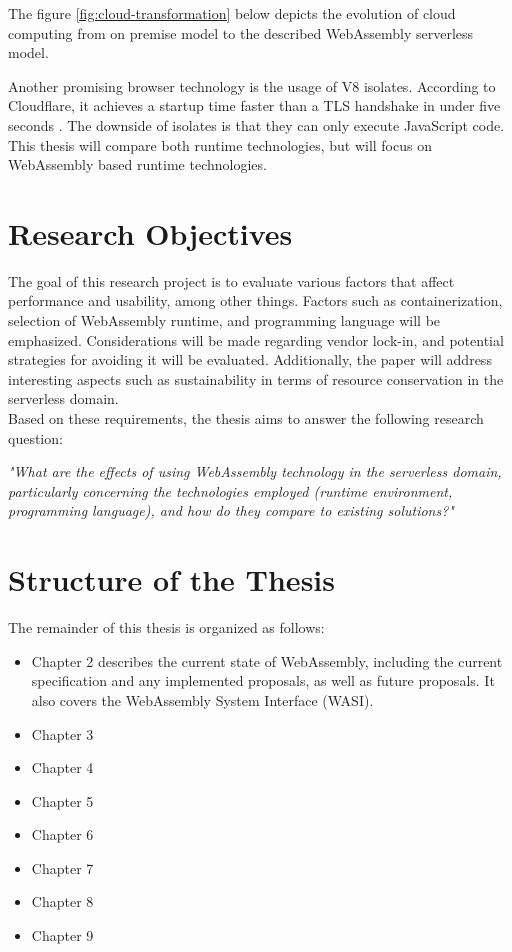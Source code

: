 The figure \ref{fig:cloud-transformation} below depicts the evolution of \gls{cloud computing} from on premise model to the described WebAssembly serverless model.

Another promising browser technology is the usage of V8 \glspl{isolate}. According to Cloudflare, it achieves a startup time faster than a TLS handshake in under five seconds \cite{partovi_2020_eliminating}. The downside of isolates is that they can only execute JavaScript code. This thesis will compare both runtime technologies, but will focus on WebAssembly based runtime technologies.

\section{Research Objectives}
The goal of this research project is to evaluate various factors that affect performance and usability, among other things. Factors such as containerization, selection of WebAssembly runtime, and programming language will be emphasized. Considerations will be made regarding vendor lock-in, and potential strategies for avoiding it will be evaluated. Additionally, the paper will address interesting aspects such as sustainability in terms of resource conservation in the serverless domain. \\
\newline
Based on these requirements, the thesis aims to answer the following research question:
\begin{center}
\textit{"What are the effects of using WebAssembly technology in the serverless domain, particularly concerning the technologies employed (runtime environment, programming language), and how do they compare to existing solutions?"}
\end{center}


\section{Structure of the Thesis}

The remainder of this thesis is organized as follows:
\begin{itemize}
  \item Chapter 2 describes the current state of WebAssembly, including the current specification and any implemented proposals, as well as future proposals. It also covers the WebAssembly System Interface (WASI).
  \item Chapter 3
  \item Chapter 4
  \item Chapter 5
  \item Chapter 6
  \item Chapter 7
  \item Chapter 8
  \item Chapter 9
\end{itemize}